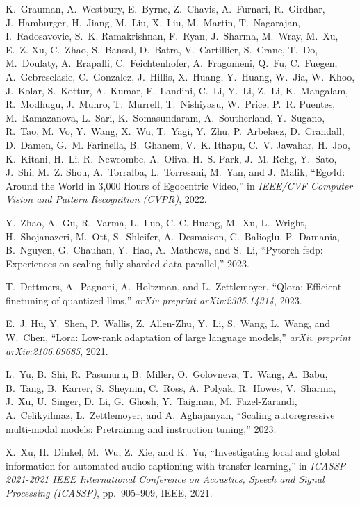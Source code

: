 \begin{thebibliography}{10}
K.~Grauman, A.~Westbury, E.~Byrne, Z.~Chavis, A.~Furnari, R.~Girdhar,
  J.~Hamburger, H.~Jiang, M.~Liu, X.~Liu, M.~Martin, T.~Nagarajan,
  I.~Radosavovic, S.~K. Ramakrishnan, F.~Ryan, J.~Sharma, M.~Wray, M.~Xu, E.~Z.
  Xu, C.~Zhao, S.~Bansal, D.~Batra, V.~Cartillier, S.~Crane, T.~Do, M.~Doulaty,
  A.~Erapalli, C.~Feichtenhofer, A.~Fragomeni, Q.~Fu, C.~Fuegen,
  A.~Gebreselasie, C.~Gonzalez, J.~Hillis, X.~Huang, Y.~Huang, W.~Jia, W.~Khoo,
  J.~Kolar, S.~Kottur, A.~Kumar, F.~Landini, C.~Li, Y.~Li, Z.~Li, K.~Mangalam,
  R.~Modhugu, J.~Munro, T.~Murrell, T.~Nishiyasu, W.~Price, P.~R. Puentes,
  M.~Ramazanova, L.~Sari, K.~Somasundaram, A.~Southerland, Y.~Sugano, R.~Tao,
  M.~Vo, Y.~Wang, X.~Wu, T.~Yagi, Y.~Zhu, P.~Arbelaez, D.~Crandall, D.~Damen,
  G.~M. Farinella, B.~Ghanem, V.~K. Ithapu, C.~V. Jawahar, H.~Joo, K.~Kitani,
  H.~Li, R.~Newcombe, A.~Oliva, H.~S. Park, J.~M. Rehg, Y.~Sato, J.~Shi, M.~Z.
  Shou, A.~Torralba, L.~Torresani, M.~Yan, and J.~Malik, ``Ego4d: Around the
  {W}orld in 3,000 {H}ours of {E}gocentric {V}ideo,'' in {\em IEEE/CVF Computer
  Vision and Pattern Recognition (CVPR)}, 2022.

Y.~Zhao, A.~Gu, R.~Varma, L.~Luo, C.-C. Huang, M.~Xu, L.~Wright,
  H.~Shojanazeri, M.~Ott, S.~Shleifer, A.~Desmaison, C.~Balioglu, P.~Damania,
  B.~Nguyen, G.~Chauhan, Y.~Hao, A.~Mathews, and S.~Li, ``Pytorch fsdp:
  Experiences on scaling fully sharded data parallel,'' 2023.

T.~Dettmers, A.~Pagnoni, A.~Holtzman, and L.~Zettlemoyer, ``Qlora: Efficient
  finetuning of quantized llms,'' {\em arXiv preprint arXiv:2305.14314}, 2023.

E.~J. Hu, Y.~Shen, P.~Wallis, Z.~Allen-Zhu, Y.~Li, S.~Wang, L.~Wang, and
  W.~Chen, ``Lora: Low-rank adaptation of large language models,'' {\em arXiv
  preprint arXiv:2106.09685}, 2021.

L.~Yu, B.~Shi, R.~Pasunuru, B.~Miller, O.~Golovneva, T.~Wang, A.~Babu, B.~Tang,
  B.~Karrer, S.~Sheynin, C.~Ross, A.~Polyak, R.~Howes, V.~Sharma, J.~Xu,
  U.~Singer, D.~Li, G.~Ghosh, Y.~Taigman, M.~Fazel-Zarandi, A.~Celikyilmaz,
  L.~Zettlemoyer, and A.~Aghajanyan, ``Scaling autoregressive multi-modal
  models: Pretraining and instruction tuning,'' 2023.

X.~Xu, H.~Dinkel, M.~Wu, Z.~Xie, and K.~Yu, ``Investigating local and global
  information for automated audio captioning with transfer learning,'' in {\em
  ICASSP 2021-2021 IEEE International Conference on Acoustics, Speech and
  Signal Processing (ICASSP)}, pp.~905--909, IEEE, 2021.


\end{thebibliography}
